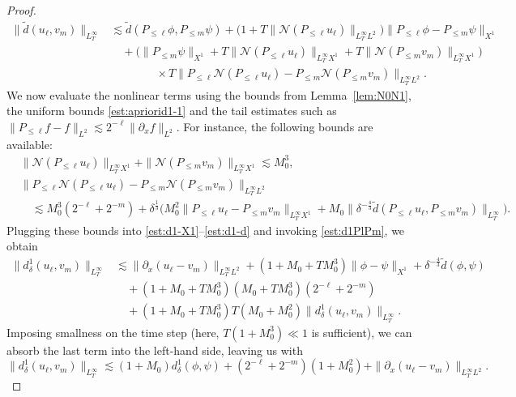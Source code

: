 \documentclass{amsart}
\numberwithin{equation}{section}
\begin{document}
\begin{proof}
\begin{equation}
\begin{aligned}
\|\widetilde{d}(u_\ell,v_m)\|_{L^\infty_T}&\lesssim \widetilde{d}(P_{\leq \ell}\phi,P_{\leq m}\psi)+\big( 1+T\| \mathcal{N}(P_{\leq \ell}u_\ell)\|_{L^\infty_TL^2}\big) \| P_{\leq \ell}\phi -P_{\leq m}\psi\|_{X^1}\\
&\quad +\big( \| P_{\leq m}\psi\|_{X^1}+T\| \mathcal{N}(P_{\leq \ell}u_\ell)\|_{L^\infty_TX^1}+T\| \mathcal{N}(P_{\leq m}v_m)\|_{L^\infty_TX^1}\big) \\
&\qquad\qquad \times T\| P_{\leq\ell}\mathcal{N}(P_{\leq \ell}u_\ell)-P_{\leq m}\mathcal{N}(P_{\leq m}v_m)\|_{L^\infty_TL^2}.
\end{aligned}
\end{equation}
We now evaluate the nonlinear terms using the bounds from Lemma~\ref{lem:N0N1}, the uniform bounds \eqref{est:apriorid1-1} and the tail estimates such as $\| P_{\leq \ell}f-f\|_{L^2}\lesssim 2^{-\ell}\| \partial_xf\|_{L^2}$.
For instance, the following bounds are available:
\begin{align*}
&\| \mathcal{N}(P_{\leq \ell} u_\ell)\|_{L^\infty_TX^1}+\| \mathcal{N}(P_{\leq m}v_m)\|_{L^\infty_TX^1}\lesssim M_0^3,\\
&\| P_{\leq\ell}\mathcal{N}(P_{\leq \ell}u_\ell)-P_{\leq m}\mathcal{N}(P_{\leq m}v_m)\|_{L^\infty_TL^2}\\
&\quad \lesssim M_0^3(2^{-\ell}+2^{-m})+\delta^{\frac13}\big( M_0^2\| P_{\leq \ell}u_\ell-P_{\leq m}v_m\|_{L^\infty_TX^1}+M_0\| \delta^{-\frac43} \widetilde{d}(P_{\leq \ell}u_\ell ,P_{\leq m}v_m)\|_{L^\infty_T}\big) .
\end{align*}
Plugging these bounds into \eqref{est:d1-X1}--\eqref{est:d1-d} and invoking \eqref{est:d1PlPm}, we obtain
\begin{align*}
\| d^1_\delta(u_\ell,v_m)\|_{L^\infty_T} &\lesssim \| \partial_x(u_\ell-v_m)\|_{L^\infty_TL^2} +(1+M_0+TM_0^3)\| \phi-\psi\|_{X^1}+\delta^{-\frac43}\widetilde{d}(\phi,\psi) \\
&\quad +(1+M_0+TM_0^3)(M_0+TM_0^3)(2^{-\ell}+2^{-m}) \\
&\quad +(1+M_0+TM_0^3)T(M_0+M_0^2) \| d^1_\delta(u_\ell,v_m)\|_{L^\infty_T}.
\end{align*}
Imposing smallness on the time step (here, $T(1+M_0^3)\ll 1$ is sufficient), we can absorb the last term into the left-hand side, leaving us with
\begin{equation}\label{est:apriorid1-A}
\| d^1_\delta(u_\ell,v_m)\|_{L^\infty_T} \lesssim (1+M_0)d^1_\delta(\phi,\psi)+(2^{-\ell}+2^{-m})(1+M_0^2) +\| \partial_x(u_\ell-v_m)\|_{L^\infty_TL^2}.
\end{equation}


\end{proof}
\end{document}
